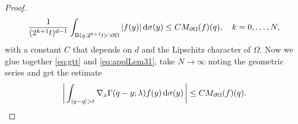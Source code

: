 \begin{proof}
  \begin{align}
    \label{eq:applLem31}
    \frac{1}{(2^{k+1} t)^{d - 1}} \int_{\mathrm{B}(q, 2^{k + 1}t) \cap \partial \Omega}  |f(y)| \, {\operatorname{d}\!{\sigma}}(y)
    \leq C M_{\partial\Omega}(f)(q), \quad k=0,\dots,N, 
  \end{align}
  with a constant $C$ that depends on $d$ and the Lipschitz character of $\Omega$.
  Now we glue together \eqref{eq:gtt} and \eqref{eq:applLem31}, take $N \to \infty$ noting the geometric series and get the estimate
  \begin{align}
    \label{eq:finalgtt}
    \bigg| \int_{|y - q| > t} \nabla_x \Gamma(q - y; \lambda) f(y) \, {\operatorname{d}\!{\sigma}}(y) \,\bigg|
    \leq C M_{\partial\Omega}(f)(q).
  \end{align}


\end{proof}
